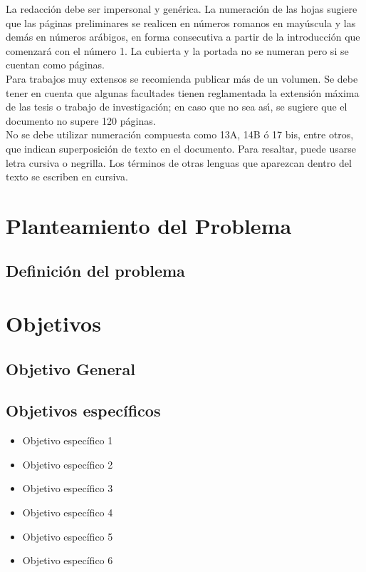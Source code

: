 La redacci\'{o}n debe ser impersonal y gen\'{e}rica. La numeraci\'{o}n de las hojas sugiere que las p\'{a}ginas preliminares se realicen en n\'{u}meros romanos en may\'{u}scula y las dem\'{a}s en n\'{u}meros ar\'{a}bigos, en forma consecutiva a partir de la introducci\'{o}n que comenzar\'{a} con el n\'{u}mero 1. La cubierta y la portada no se numeran pero si se cuentan como p\'{a}ginas.\\

Para trabajos muy extensos se recomienda publicar m\'{a}s de un volumen. Se debe tener en cuenta que algunas facultades tienen reglamentada la extensi\'{o}n m\'{a}xima de las tesis  o trabajo de investigaci\'{o}n; en caso que no sea as\'{\i}, se sugiere que el documento no supere 120 p\'{a}ginas.\\

No se debe utilizar numeraci\'{o}n compuesta como 13A, 14B \'{o} 17 bis, entre otros, que indican superposici\'{o}n de texto en el documento. Para resaltar, puede usarse letra cursiva o negrilla. Los t\'{e}rminos de otras lenguas que aparezcan dentro del texto se escriben en cursiva.\\

\section{Planteamiento del Problema}
\subsection{Definici\'on del problema}

\section{Objetivos}
\subsection{Objetivo General}
\subsection{Objetivos espec\'ificos}
\begin{itemize}
	
	\item Objetivo espec\'ifico 1 
	\item Objetivo espec\'ifico 2 
	\item Objetivo espec\'ifico 3 
	\item Objetivo espec\'ifico 4 
	\item Objetivo espec\'ifico 5 
	\item Objetivo espec\'ifico 6 
\end{itemize}


